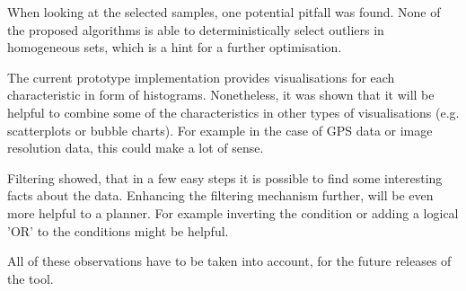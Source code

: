 When looking at the selected samples, one potential pitfall was found. None of the proposed algorithms is able to deterministically select outliers in homogeneous sets, which is a hint for a further optimisation.

The current prototype implementation provides visualisations for each characteristic in form of histograms. Nonetheless, it was shown that it will be helpful to combine some of the characteristics in other types of visualisations (e.g. scatterplots or bubble charts). For example in the case of GPS data or image resolution data, this could make a lot of sense.

Filtering showed, that in a few easy steps it is possible to find some interesting facts about the data. Enhancing the filtering mechanism further, will be even more helpful to a planner. For example inverting the condition or adding a logical 'OR' to the conditions might be helpful.

All of these observations have to be taken into account, for the future releases of the tool.